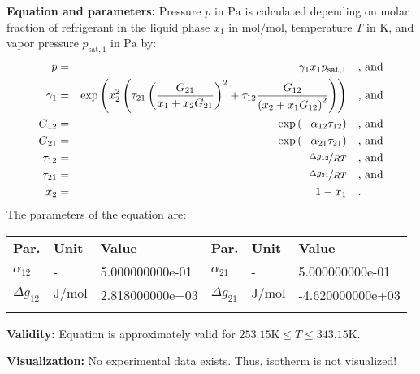 \textbf{Equation and parameters:}
\newline
%
Pressure $p$ in $\si{\pascal}$ is calculated depending on molar fraction of refrigerant in the liquid phase $x_1$ in $\si{\mole\per\mole}$, temperature $T$ in $\si{\kelvin}$, and vapor pressure $p_\mathrm{sat,1}$ in $\si{\pascal}$ by:
%
\begin{equation*}
\begin{split}
p &=& \gamma_1 x_1 p_\mathrm{sat,1} & \quad\text{, and} \\
\gamma_1 &=& \exp \left( x_2^2 \left( \tau_{21} \left( \frac{G_{21}}{x_1 + x_2 G_{21}} \right) ^2 + \tau_{12} \frac{G_{12}}{\left( x_2 + x_1 G_{12} \right) ^2}\right) \right) & \quad\text{, and} \\
G_{12} &=& \exp \left( -\alpha_{12} \tau_{12} \right) & \quad\text{, and} \\
G_{21} &=& \exp \left( -\alpha_{21} \tau_{21} \right) & \quad\text{, and} \\
\tau_{12} &=& \nicefrac{\Delta g_{12}}{R T} & \quad\text{, and} \\
\tau_{21} &=& \nicefrac{\Delta g_{21}}{R T} & \quad\text{, and} \\
x_2 &=& 1 - x_1  & \quad\text{.} \\
\end{split}
\end{equation*}
%
The parameters of the equation are:
%
\begin{longtable}[l]{lll|lll}
\toprule
\addlinespace
\textbf{Par.} & \textbf{Unit} & \textbf{Value} &	\textbf{Par.} & \textbf{Unit} & \textbf{Value} \\
\addlinespace
\midrule
\endhead

\bottomrule
\endfoot
\bottomrule
\endlastfoot
\addlinespace

$\alpha_{12}$ & - & 5.000000000e-01 & $\alpha_{21}$ & - & 5.000000000e-01 \\
$\Delta g_{12}$ & $\si{\joule\per\mole}$ & 2.818000000e+03 & $\Delta g_{21}$ & $\si{\joule\per\mole}$ & -4.620000000e+03 \\

\addlinespace\end{longtable}

\textbf{Validity:}
\newline
Equation is approximately valid for $253.15 \si{\kelvin} \leq T \leq 343.15 \si{\kelvin}$.
\newline

\textbf{Visualization:}
%
\newline
No experimental data exists. Thus, isotherm is not visualized!
%

\FloatBarrier
\newpage
